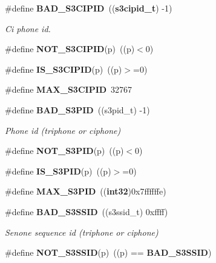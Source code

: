 \begin{DoxyCompactItemize}
\item 
\#define {\bf \-B\-A\-D\-\_\-\-S3\-C\-I\-P\-I\-D}~(({\bf s3cipid\-\_\-t}) -\/1)\label{s3types_8h_af9c51863cdbb10d58b6aad21e896666b}

\begin{DoxyCompactList}\small\item\em \-Ci phone id. \end{DoxyCompactList}\item 
\#define {\bfseries \-N\-O\-T\-\_\-\-S3\-C\-I\-P\-I\-D}(p)~((p)$<$0)\label{s3types_8h_ad7a2359e1e705906c58fe33f9729f6ce}

\item 
\#define {\bfseries \-I\-S\-\_\-\-S3\-C\-I\-P\-I\-D}(p)~((p)$>$=0)\label{s3types_8h_af719889a0db4f4f0b4b2ac9201bbe7cd}

\item 
\#define {\bfseries \-M\-A\-X\-\_\-\-S3\-C\-I\-P\-I\-D}~32767\label{s3types_8h_a453101a056aef746b77e9768a1cb60a5}

\item 
\#define {\bf \-B\-A\-D\-\_\-\-S3\-P\-I\-D}~((s3pid\-\_\-t) -\/1)\label{s3types_8h_a4037acb07f1abc6c8a1aac0841556440}

\begin{DoxyCompactList}\small\item\em \-Phone id (triphone or ciphone) \end{DoxyCompactList}\item 
\#define {\bfseries \-N\-O\-T\-\_\-\-S3\-P\-I\-D}(p)~((p)$<$0)\label{s3types_8h_ae3dad97c1cf3e6347c347bf633ee27dd}

\item 
\#define {\bfseries \-I\-S\-\_\-\-S3\-P\-I\-D}(p)~((p)$>$=0)\label{s3types_8h_afe39bcb2b878fb92ebd7b3e249304264}

\item 
\#define {\bfseries \-M\-A\-X\-\_\-\-S3\-P\-I\-D}~(({\bf int32})0x7ffffffe)\label{s3types_8h_a1141ddc85d582a6e1a1c70609baab281}

\item 
\#define {\bf \-B\-A\-D\-\_\-\-S3\-S\-S\-I\-D}~((s3ssid\-\_\-t) 0xffff)\label{s3types_8h_ade0bee313d69b3d324b5622fa0507ec7}

\begin{DoxyCompactList}\small\item\em \-Senone sequence id (triphone or ciphone) \end{DoxyCompactList}\item 
\#define {\bfseries \-N\-O\-T\-\_\-\-S3\-S\-S\-I\-D}(p)~((p) == {\bf \-B\-A\-D\-\_\-\-S3\-S\-S\-I\-D})\label{s3types_8h_a970be643bdeb0467b4bab2395d76293b}


\end{DoxyCompactItemize}
